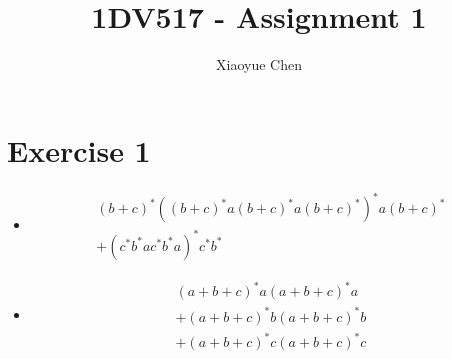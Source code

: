 \documentclass{article}
\title{1DV517 - Assignment 1}
\author{Xiaoyue Chen}
\begin{document}
\maketitle

\section*{Exercise 1}
\begin{itemize}
	\item \begin{align*}
		      (b+c)^* ((b+c)^* a (b+c)^* a (b+c)^*)^* a (b+c)^* \\
		      + (c^* b^* a c^* b^* a)^* c^* b^*
	      \end{align*}
	\item
	      \begin{align*}
		      (a+b+c)^* a (a+b+c)^* a   \\
		      + (a+b+c)^* b (a+b+c)^* b \\
		      + (a+b+c)^* c (a+b+c)^* c
	      \end{align*}
\end{itemize}
\end{document}
